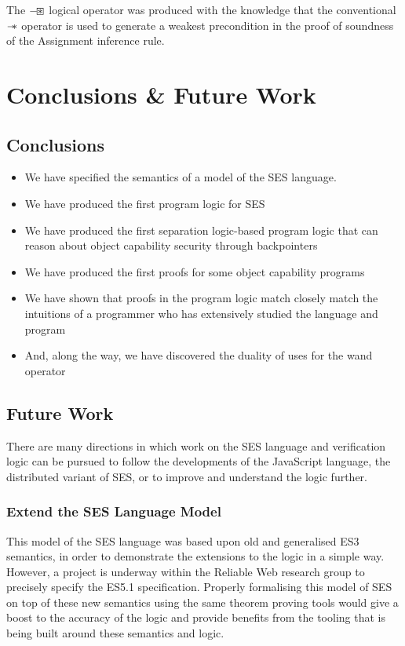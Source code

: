 \documentclass[a4paper,notitlepage]{report}
\begin{document}
The $\mathbin{-\mkern-3mu \boxast}$ logical operator was produced with the knowledge that the
conventional $\mathbin{-\mkern-6mu *}$ operator is used to generate a weakest precondition in the
proof of soundness of the Assignment inference rule.

\chapter{Conclusions \& Future Work}
\section{Conclusions}
\begin{itemize}
  \item We have specified the semantics of a model of the SES language.
  \item We have produced the first program logic for SES
  \item We have produced the first separation logic-based program logic that can
    reason about object capability security through backpointers
  \item We have produced the first proofs for some object capability programs
  \item We have shown that proofs in the program logic match closely match the
    intuitions of a programmer who has extensively studied the language and
    program
  \item And, along the way, we have discovered the duality of uses for the wand
    operator
\end{itemize}

\section{Future Work}
There are many directions in which work on the SES language and verification
logic can be pursued to follow the developments of the JavaScript language, the
distributed variant of SES, or to improve and understand the logic further.

\subsection{Extend the SES Language Model}
This model of the SES language was based upon old and generalised ES3 semantics,
in order to demonstrate the extensions to the logic in a simple way.
However, a project is underway within the Reliable Web research group to
precisely specify the ES5.1 specification.
Properly formalising this model of SES on top of these new semantics using the
same theorem proving tools would give a boost to the accuracy of the logic and
provide benefits from the tooling that is being built around these semantics and
logic.
\end{document}
